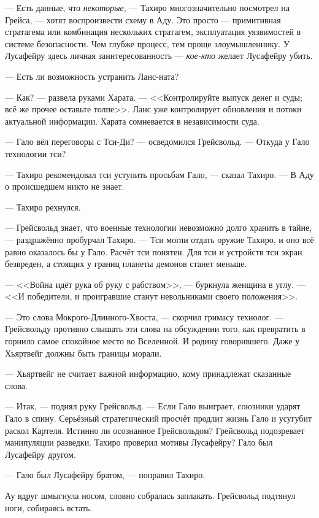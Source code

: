 --- Есть данные, что \emph{некоторые}, --- Тахиро многозначительно посмотрел на Грейса, --- хотят воспроизвести схему в Аду.
Это просто --- примитивная стратагема или комбинация нескольких стратагем, эксплуатация уязвимостей в системе безопасности.
Чем глубже процесс, тем проще злоумышленнику.
У Лусафейру здесь личная заинтересованность --- \emph{кое-кто} желает Лусафейру убить.

--- Есть ли возможность устранить Ланс-ната?

--- Как? --- развела руками Харата.
--- <<Контролируйте выпуск денег и суды; всё же прочее оставьте толпе>>.
Ланс уже контролирует обновления и потоки актуальной информации.
Харата сомневается в независимости суда.

--- Гало вёл переговоры с Тси-Ди? --- осведомился Грейсвольд.
--- Откуда у Гало технологии тси?

--- Тахиро рекомендовал тси уступить просьбам Гало, --- сказал Тахиро.
--- В Аду о происшедшем никто не знает.

--- Тахиро рехнулся.

--- Грейсвольд знает, что военные технологии невозможно долго хранить в тайне, --- раздражённо пробурчал Тахиро.
--- Тси могли отдать оружие Тахиро, и оно всё равно оказалось бы у Гало.
Расчёт тси понятен.
Для тси и устройств тси экран безвреден, а стоящих у границ планеты демонов станет меньше.

--- <<Война идёт рука об руку с рабством>>, --- буркнула женщина в углу. --- <<И победители, и проигравшие станут невольниками своего положения>>.

--- Это слова Мокрого-Длинного-Хвоста, --- скорчил гримасу технолог.
--- Грейсвольду противно слышать эти слова на обсуждении того, как превратить в горнило самое спокойное место во Вселенной.
И родину говорившего.
Даже у Хьяртвейг должны быть границы морали.

--- Хьяртвейг не считает важной информацию, кому принадлежат сказанные слова.

--- Итак, --- поднял руку Грейсвольд.
--- Если Гало выиграет, союзники ударят Гало в спину.
Серьёзный стратегический просчёт продлит жизнь Гало и усугубит раскол Картеля.
Истинно ли осознанное Грейсвольдом?
Грейсвольд подозревает манипуляции разведки.
Тахиро проверил мотивы Лусафейру?
Гало был Лусафейру другом.

--- Гало был Лусафейру братом, --- поправил Тахиро.

Ау вдруг шмыгнула носом, словно собралась заплакать.
Грейсвольд подтянул ноги, собираясь встать.

